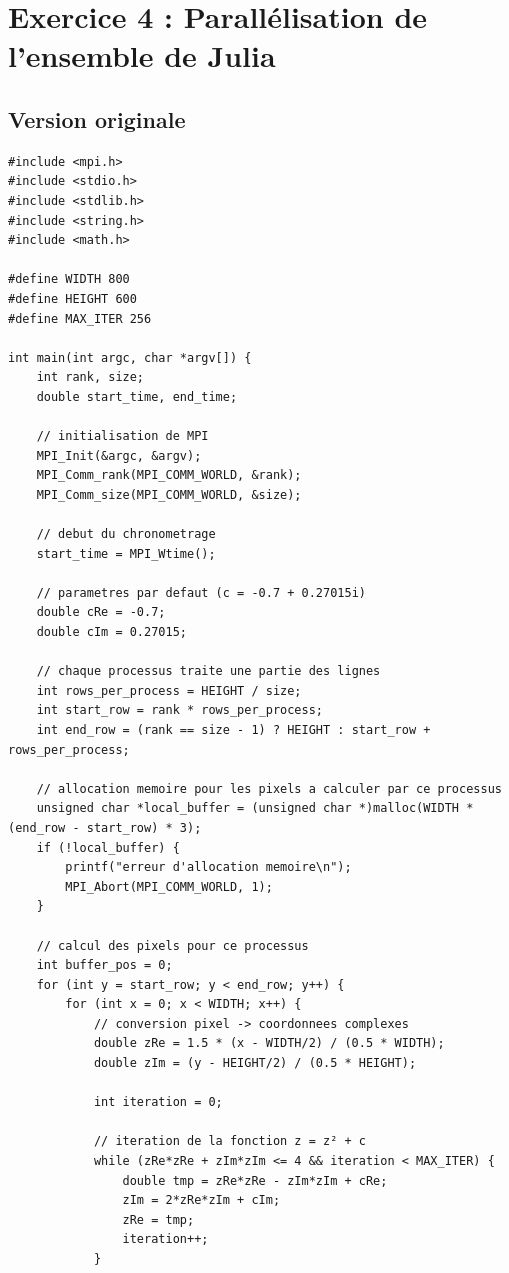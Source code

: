 \documentclass[a4paper,11pt]{article}
\begin{document}
\section{Exercice 4 : Parallélisation de l'ensemble de Julia}

\subsection{Version originale}

\begin{lstlisting}[caption=Exercice 4 : Version originale avec MPI\_Send/MPI\_Recv]
#include <mpi.h>
#include <stdio.h>
#include <stdlib.h>
#include <string.h>
#include <math.h>

#define WIDTH 800
#define HEIGHT 600
#define MAX_ITER 256

int main(int argc, char *argv[]) {
    int rank, size;
    double start_time, end_time;
    
    // initialisation de MPI
    MPI_Init(&argc, &argv);
    MPI_Comm_rank(MPI_COMM_WORLD, &rank);
    MPI_Comm_size(MPI_COMM_WORLD, &size);
    
    // debut du chronometrage
    start_time = MPI_Wtime();
    
    // parametres par defaut (c = -0.7 + 0.27015i)
    double cRe = -0.7;
    double cIm = 0.27015;
    
    // chaque processus traite une partie des lignes
    int rows_per_process = HEIGHT / size;
    int start_row = rank * rows_per_process;
    int end_row = (rank == size - 1) ? HEIGHT : start_row + rows_per_process;
    
    // allocation memoire pour les pixels a calculer par ce processus
    unsigned char *local_buffer = (unsigned char *)malloc(WIDTH * (end_row - start_row) * 3);
    if (!local_buffer) {
        printf("erreur d'allocation memoire\n");
        MPI_Abort(MPI_COMM_WORLD, 1);
    }
    
    // calcul des pixels pour ce processus
    int buffer_pos = 0;
    for (int y = start_row; y < end_row; y++) {
        for (int x = 0; x < WIDTH; x++) {
            // conversion pixel -> coordonnees complexes
            double zRe = 1.5 * (x - WIDTH/2) / (0.5 * WIDTH);
            double zIm = (y - HEIGHT/2) / (0.5 * HEIGHT);
            
            int iteration = 0;
            
            // iteration de la fonction z = z² + c
            while (zRe*zRe + zIm*zIm <= 4 && iteration < MAX_ITER) {
                double tmp = zRe*zRe - zIm*zIm + cRe;
                zIm = 2*zRe*zIm + cIm;
                zRe = tmp;
                iteration++;
            }
            

\end{lstlisting}
\end{document}
